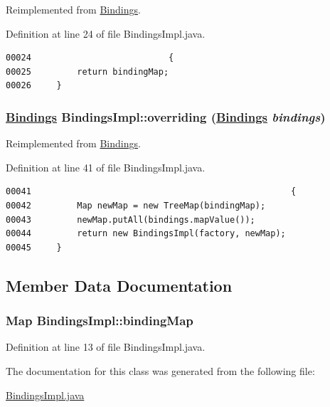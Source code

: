 Reimplemented from \hyperlink{interfaceBindings_a0}{Bindings}.

Definition at line 24 of file Bindings\-Impl.java.\footnotesize\begin{verbatim}00024                           {
00025         return bindingMap;
00026     }
\end{verbatim}\normalsize 
\hypertarget{classBindingsImpl_a3}{
\subsubsection[overriding]{\setlength{\rightskip}{0pt plus 5cm}\hyperlink{interfaceBindings}{Bindings} Bindings\-Impl::overriding (\hyperlink{interfaceBindings}{Bindings} {\em bindings})}}
\label{classBindingsImpl_a3}




Reimplemented from \hyperlink{interfaceBindings_a3}{Bindings}.

Definition at line 41 of file Bindings\-Impl.java.\footnotesize\begin{verbatim}00041                                                   {
00042         Map newMap = new TreeMap(bindingMap);
00043         newMap.putAll(bindings.mapValue());
00044         return new BindingsImpl(factory, newMap);
00045     }
\end{verbatim}\normalsize 


\subsection{Member Data Documentation}
\hypertarget{classBindingsImpl_o0}{
\subsubsection[bindingMap]{\setlength{\rightskip}{0pt plus 5cm}Map Bindings\-Impl::binding\-Map}}
\label{classBindingsImpl_o0}




Definition at line 13 of file Bindings\-Impl.java.

The documentation for this class was generated from the following file:\begin{CompactItemize}
\item 
\hyperlink{BindingsImpl_8java-source}{Bindings\-Impl.java}\end{CompactItemize}
